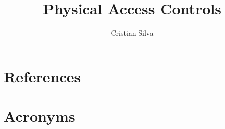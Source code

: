\documentclass[PMO,authoryear,toc]{lsstdoc}
\title{Physical Access Controls}
\author{%
Cristian Silva
}
\date{\vcsDate}
\begin{document}
\maketitle


\appendix
\section{References} \label{sec:bib}
\renewcommand{\refname}{} %


\section{Acronyms} \label{sec:acronyms}

\end{document}
